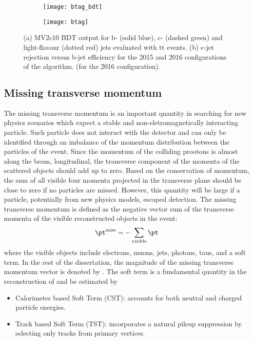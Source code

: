 \begin{figure}[t!]
\centering
\begin{subfigure}[t]{0.48\textwidth}
\texttt{[image: btag\_bdt]}
\subcaption{}
\label{fig:exp.btag.bdt}
\end{subfigure}
\begin{subfigure}[t]{0.48\textwidth}
\texttt{[image: btag]}
\subcaption{}
\label{fig:exp.btag.eff}
\end{subfigure}
\vspace{-0.25cm}
\caption{
(a) MV2c10 BDT output for b- (solid blue), c- (dashed green) and light-flavour (dotted red) jets evaluated with tt events. 
(b) c-jet rejection versus b-jet efficiency for the 2015 and 2016 configurations of the algorithm.
 (for the 2016 configuration). 
}
\label{fig:exp.btag}
\end{figure} 


\subsection{Missing transverse momentum}
The missing transverse momentum is an important quantity in searching for new physics scenarios which expect a stable and non-eletromagnetically interacting 
particle. Such particle does not interact with the detector and can only be identified through an imbalance of the momentum distribution between the particles 
of the event. 
Since the momentum of the colliding prootons is almost along the beam, longitudinal, the transverse component of the momenta of the scattered objects should add 
up to zero.
Based on the conservation of momentum, the sum of all visible four momenta projected in the transverse plane should be close to zero if no particles are missed.
However, this quantity will be large if a particle, potentially from new physics models, escaped detection. 
The missing transverse momentum is defined as the negative vector sum of the transverse momenta of the visible reconstructed objects in the event: 
\begin{equation}
\pt^{\rm{miss}} = - \sum_\text{visible} \pt
\end{equation}
where the visible objects include electrons, muons, jets, photons, taus, and a soft term.
In the rest of the dissertation, the magnitude of the missing transverse momentum vector is denoted by \met.
The soft term  is  a fundamental quantity in the reconstruction of \met and be estimated by 
\begin{itemize}
\item Calorimeter based Soft Term (CST): accounts for both neutral and charged particle energies.
\item Track based Soft Term (TST): incorporates a natural pileup suppression by selecting only tracks from primary vertices.
\end{itemize}

